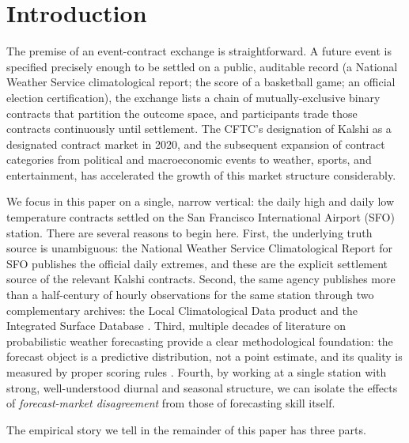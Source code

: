 \documentclass[11pt]{article}
\begin{document}

\section{Introduction}

The premise of an event-contract exchange is straightforward. A future event is
specified precisely enough to be settled on a public, auditable record (a
National Weather Service climatological report; the score of a basketball game;
an official election certification), the exchange lists a chain of
mutually-exclusive binary contracts that partition the outcome space, and
participants trade those contracts continuously until settlement. The CFTC's
designation of Kalshi as a designated contract market in 2020, and the
subsequent expansion of contract categories from political and macroeconomic
events to weather, sports, and entertainment, has accelerated the growth of
this market structure considerably.

We focus in this paper on a single, narrow vertical: the daily high and daily
low temperature contracts settled on the San Francisco International Airport
(SFO) station. There are several reasons to begin here. First, the underlying
truth source is unambiguous: the National Weather Service Climatological Report
for SFO publishes the official daily extremes, and these are the explicit
settlement source of the relevant Kalshi contracts. Second, the same agency
publishes more than a half-century of hourly observations for the same station
through two complementary archives: the Local Climatological Data product
\citep{noaalcd} and the Integrated Surface Database \citep{noaaisd}. Third,
multiple decades of literature on probabilistic weather forecasting
\citep{gneiting2014probabilistic,rasp2018neural,taillardat2016calibrated,brier1950verification}
provide a clear methodological foundation: the forecast object is a predictive
distribution, not a point estimate, and its quality is measured by proper
scoring rules \citep{gneiting2007strictly}. Fourth, by working at a single
station with strong, well-understood diurnal and seasonal structure, we can
isolate the effects of \emph{forecast-market disagreement} from those of
forecasting skill itself.

The empirical story we tell in the remainder of this paper has three parts.
\end{document}
